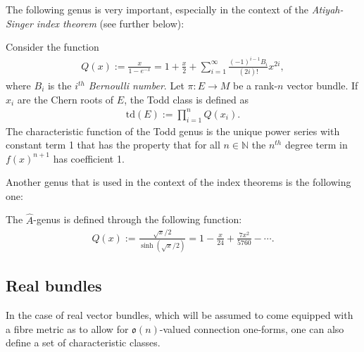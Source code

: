     The following genus is very important, especially in the context of the \textit{Atiyah-Singer index theorem} (see further below):
    \begin{example}\label{bundle:todd_class}
        Consider the function
        \begin{gather}
            Q(x) := \frac{x}{1-e^{-x}} = 1 + \frac{x}{2} + \sum_{i=1}^\infty\frac{(-1)^{i-1}B_i}{(2i)!}x^{2i},
        \end{gather}
        where $B_i$ is the $i^{th}$ \textit{Bernoulli number}. Let $\pi:E\rightarrow M$ be a rank-$n$ vector bundle. If $x_i$ are the Chern roots of $E$, the Todd class is defined as
        \begin{gather}
            \mathrm{td}(E) := \prod_{i=1}^nQ(x_i).
        \end{gather}
        The characteristic function of the Todd genus is the unique power series with constant term 1 that has the property that for all $n\in\mathbb{N}$ the $n^{th}$ degree term in $f(x)^{n+1}$ has coefficient 1.
    \end{example}
    Another genus that is used in the context of the index theorems is the following one:
    \begin{example}\label{bundle:a_roof_genus}
        The $\hat{A}$-genus is defined through the following function:
        \begin{gather}
            Q(x) := \frac{\sqrt{x}/2}{\sinh(\sqrt{x}/2)} = 1 - \frac{x}{24} + \frac{7x^2}{5760} - \cdots.
        \end{gather}
    \end{example}

\subsection{Real bundles}

    In the case of real vector bundles, which will be assumed to come equipped with a fibre metric as to allow for $\mathfrak{o}(n)$-valued connection one-forms, one can also define a set of characteristic classes.


